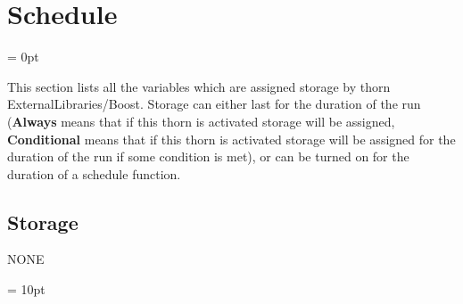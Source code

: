 
\section{Schedule} 


\parskip = 0pt


\noindent This section lists all the variables which are assigned storage by thorn ExternalLibraries/Boost.  Storage can either last for the duration of the run ({\bf Always} means that if this thorn is activated storage will be assigned, {\bf Conditional} means that if this thorn is activated storage will be assigned for the duration of the run if some condition is met), or can be turned on for the duration of a schedule function.


\subsection*{Storage}NONE

\vspace{5mm}\parskip = 10pt 
